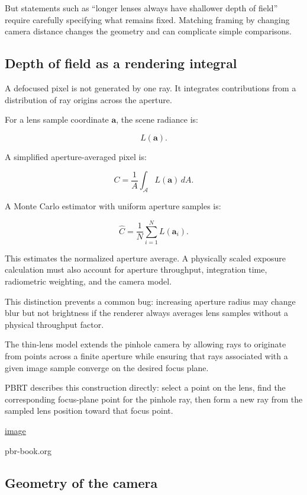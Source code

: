 But statements such as ``longer lenses always have shallower depth of field'' require carefully specifying what remains fixed. Matching framing by changing camera distance changes the geometry and can complicate simple comparisons.

\subsection{Depth of field as a rendering integral}\label{02-foundations-ii-ch036-depth-of-field-as-a-rendering-integral}

A defocused pixel is not generated by one ray. It integrates contributions from a distribution of ray origins across the aperture.

For a lens sample coordinate \(\mathbf a\), the scene radiance is:

\[ L(\mathbf a). \]

A simplified aperture-averaged pixel is:

\[ \boxed{ C= \frac1{A}\int_{\mathcal A}L(\mathbf a)\,dA. } \]

A Monte Carlo estimator with uniform aperture samples is:

\[ \boxed{ \widehat C= \frac1N\sum_{i=1}^{N}L(\mathbf a_i). } \]

This estimates the normalized aperture average. A physically scaled exposure calculation must also account for aperture throughput, integration time, radiometric weighting, and the camera model.

This distinction prevents a common bug: increasing aperture radius may change blur but not brightness if the renderer always averages lens samples without a physical throughput factor.

The thin-lens model extends the pinhole camera by allowing rays to originate from points across a finite aperture while ensuring that rays associated with a given image sample converge on the desired focus plane.

PBRT describes this construction directly: select a point on the lens, find the corresponding focus-plane point for the pinhole ray, then form a new ray from the sampled lens position toward that focus point. 

\href{https://www.google.com/s2/favicons?domain=https://www.pbr-book.org&sz=32}{image}

pbr-book.org

\subsection{Geometry of the camera}\label{02-foundations-ii-ch036-geometry-of-the-camera}

